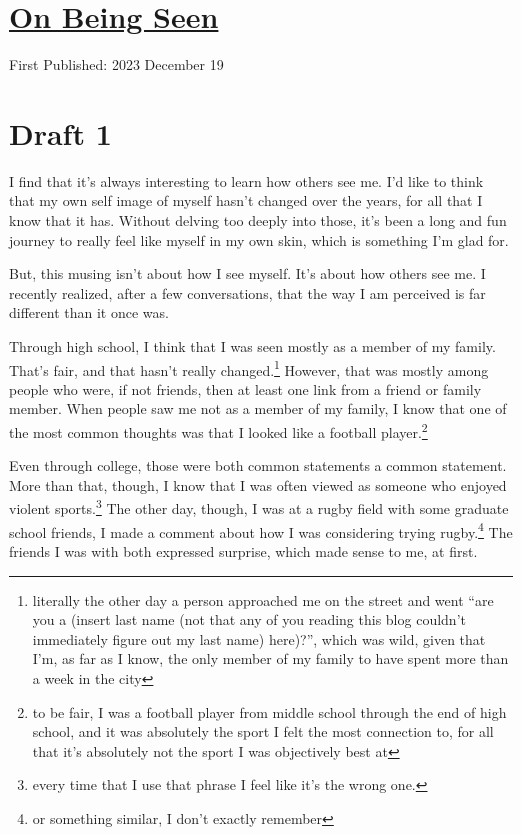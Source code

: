 \documentclass[12pt]{article}[titlepage]
\newcommand{\say}[1]{``#1''}
\renewcommand{\,}{\textsuperscript{,}}
\begin{document}
\doublespacing
\section{\href{being-seen.html}{On Being Seen}}
First Published: 2023 December 19

\section{Draft 1}
I find that it's always interesting to learn how others see me.
I'd like to think that my own self image of myself hasn't changed over the years, for all that I know that it has.
Without delving too deeply into those, it's been a long and fun journey to really feel like myself in my own skin, which is something I'm glad for.

But, this musing isn't about how I see myself.
It's about how others see me.
I recently realized, after a few conversations, that the way I am perceived is far different than it once was.

Through high school, I think that I was seen mostly as a member of my family.
That's fair, and that hasn't really changed.\footnote{literally the other day a person approached me on the street and went \say{are you a (insert last name (not that any of you reading this blog couldn't immediately figure out my last name) here)?}, which was wild, given that I'm, as far as I know, the only member of my family to have spent more than a week in the city}
However, that was mostly among people who were, if not friends, then at least one link from a friend or family member.
When people saw me not as a member of my family, I know that one of the most common thoughts was that I looked like a football player.\footnote{to be fair, I was a football player from middle school through the end of high school, and it was absolutely the sport I felt the most connection to, for all that it's absolutely not the sport I was objectively best at}

Even through college, those were both common statements a common statement.
More than that, though, I know that I was often viewed as someone who enjoyed violent sports.\footnote{every time that I use that phrase I feel like it's the wrong one.}
The other day, though, I was at a rugby field with some graduate school friends, I made a comment about how I was considering trying rugby.\footnote{or something similar, I don't exactly remember}
The friends I was with both expressed surprise, which made sense to me, at first.
\end{document}

